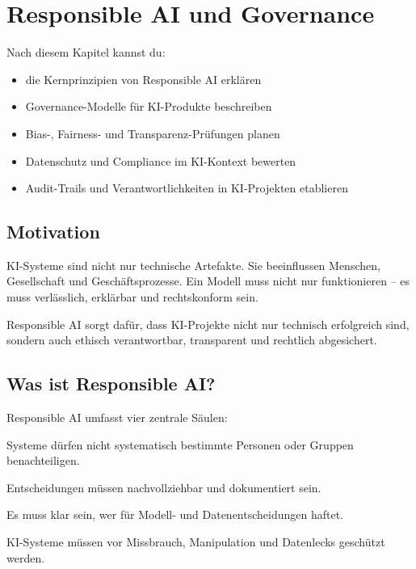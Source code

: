 \chapter{Responsible AI und Governance}

\label{chap:responsible_ai_governance}

\begin{lernziele}
Nach diesem Kapitel kannst du:
\begin{itemize}
    \item die Kernprinzipien von Responsible AI erklären
    \item Governance-Modelle für KI-Produkte beschreiben
    \item Bias-, Fairness- und Transparenz-Prüfungen planen
    \item Datenschutz und Compliance im KI-Kontext bewerten
    \item Audit-Trails und Verantwortlichkeiten in KI-Projekten etablieren
\end{itemize}
\end{lernziele}

\section{Motivation}

KI-Systeme sind nicht nur technische Artefakte. Sie beeinflussen Menschen, Gesellschaft und Geschäftsprozesse. Ein Modell muss nicht nur funktionieren -- es muss verlässlich, erklärbar und rechtskonform sein.

Responsible AI sorgt dafür, dass KI-Projekte nicht nur technisch erfolgreich sind, sondern auch ethisch verantwortbar, transparent und rechtlich abgesichert.

\section{Was ist Responsible AI?}

Responsible AI umfasst vier zentrale Säulen:

\begin{description}[leftmargin=*,style=nextline]
    \item[Fairness] Systeme dürfen nicht systematisch bestimmte Personen oder Gruppen benachteiligen.
    \item[Transparenz] Entscheidungen müssen nachvollziehbar und dokumentiert sein.
    \item[Verantwortung] Es muss klar sein, wer für Modell- und Datenentscheidungen haftet.
    \item[Sicherheit] KI-Systeme müssen vor Missbrauch, Manipulation und Datenlecks geschützt werden.
\end{description}

